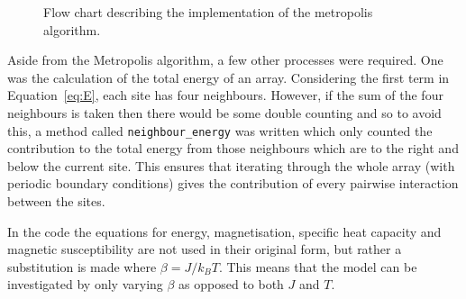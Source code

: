 \documentclass[11pt]{article}
\begin{document}
\begin{figure}[!ht]
\centering
{}
\caption{Flow chart describing the implementation of the metropolis algorithm.}
\label{fig:flow}
\end{figure}

Aside from the Metropolis algorithm, a few other processes were required. One was the calculation of the total energy of an array. Considering the first term in Equation~\ref{eq:E}, each site has four neighbours. However, if the sum of the four neighbours is taken then there would be some double counting and so to avoid this, a method called \texttt{neighbour\_energy} was written which only counted the contribution to the total energy from those neighbours which are to the right and below the current site. This ensures that iterating through the whole array (with periodic boundary conditions) gives the contribution of every pairwise interaction between the sites.

In the code the equations for energy, magnetisation, specific heat capacity and magnetic susceptibility are not used in their original form, but rather a substitution is made where $\beta = J/k_{B}T$. This means that the model can be investigated by only varying $\beta$ as opposed to both $J$ and $T$.
\end{document}
